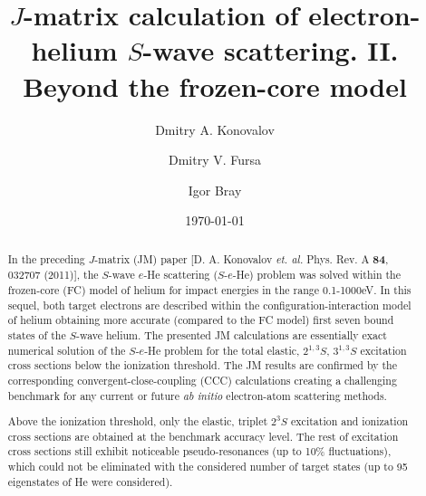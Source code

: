 \documentclass[aip
, pra
, showpacs
, aps
, twocolumn
, groupedaddress
, floatfix
]{revtex4}
\begin{document}
\title {$J$-matrix calculation of electron-helium $S$-wave scattering. II. Beyond the frozen-core model}

\author{Dmitry A. Konovalov}

\author{Dmitry V. Fursa}

\author{Igor Bray}



\date{\today}

\begin{abstract}

In the preceding $J$-matrix (JM) paper [D. A. Konovalov {\em et. al.} Phys. Rev. A {\bf 84}, 032707 (2011)],
the $S$-wave $e$-He scattering ($S$-$e$-He) problem was solved within the frozen-core (FC) model of helium for impact energies in the range 0.1-1000eV.
In this sequel, both target electrons are described within the configuration-interaction model of helium obtaining  more accurate (compared to the FC model)
first seven bound states of the $S$-wave helium.
The presented JM calculations are essentially exact numerical solution of the
$S$-$e$-He problem
for the total elastic, $2^{1,3}S$, $3^{1,3}S$ excitation cross sections below the ionization threshold.
The JM results are confirmed by the corresponding convergent-close-coupling (CCC) calculations creating a challenging benchmark
for any current or future {\it ab initio} electron-atom scattering methods.

Above the ionization threshold, only the elastic, triplet $2^3S$ excitation and ionization cross sections are obtained at the benchmark accuracy level.
The rest of excitation cross sections still exhibit noticeable pseudo-resonances (up to 10\% fluctuations),
which could not be eliminated with the considered number of target states (up to 95 eigenstates of He were considered).


\end{abstract}

\maketitle
\end{document}
